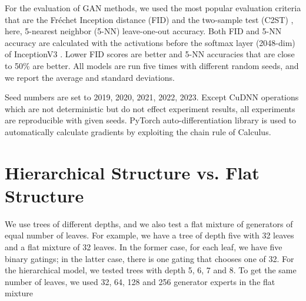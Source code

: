 \documentclass[a4paper,onesided,12pt]{report}
\begin{document}
For the evaluation of GAN methods, we used the most popular evaluation criteria that are the Fr\'echet Inception distance (FID) \cite{twotimes} and the two-sample test (C2ST) \cite{twosample}, here, 5-nearest neighbor (5-NN) leave-one-out accuracy. Both FID and 5-NN accuracy are calculated with the activations before the softmax layer (2048-dim) of InceptionV3 \cite{inceptionv3}. Lower FID scores are better and 5-NN accuracies that are close to 50\% are better. All models are run five times with different random seeds, and we report the average and standard deviations.

Seed numbers are set to {2019, 2020, 2021, 2022, 2023}. Except CuDNN \cite{chetlur2014cudnn} operations which are not deterministic but do not effect experiment results, all experiments are reproducible with given seeds. PyTorch auto-differentiation library \cite{paszke2017automatic} is used to automatically calculate gradients by exploiting the chain rule of Calculus. 

\section{Hierarchical Structure vs. Flat Structure}
\label{sec:hme-vs-me}
We use trees of different depths, and we also test a flat mixture of generators of equal number of leaves. For example, we have a tree of depth five with 32 leaves and a flat mixture of 32 leaves. In the former case, for each leaf, we have five binary gatings; in the latter case, there is one gating that chooses one of 32. For the hierarchical model, we tested trees with depth 5, 6, 7 and 8. To get the same number of leaves, we used 32, 64, 128 and 256 generator experts in the flat mixture
\end{document}
